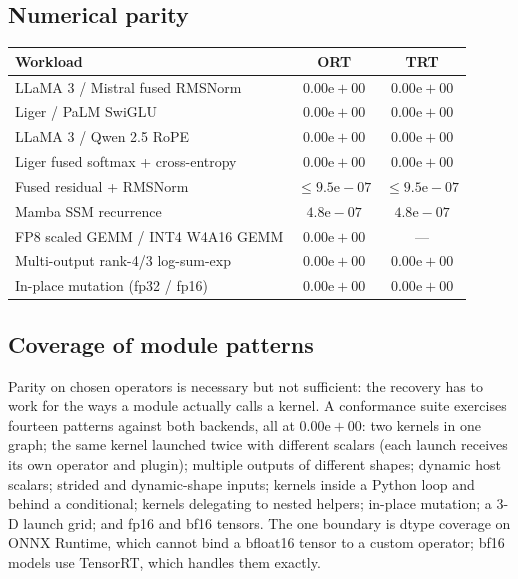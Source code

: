 \documentclass[10pt]{article}
\begin{document}
\subsection{Numerical parity}

\begin{center}
\small
\begin{tabular}{lcc}
\toprule
\textbf{Workload} & \textbf{ORT} & \textbf{TRT} \\ \midrule
LLaMA 3 / Mistral fused RMSNorm & $0.00\text{e}{+}00$ & $0.00\text{e}{+}00$ \\
Liger / PaLM SwiGLU & $0.00\text{e}{+}00$ & $0.00\text{e}{+}00$ \\
LLaMA 3 / Qwen 2.5 RoPE & $0.00\text{e}{+}00$ & $0.00\text{e}{+}00$ \\
Liger fused softmax + cross-entropy & $0.00\text{e}{+}00$ & $0.00\text{e}{+}00$ \\
Fused residual + RMSNorm & $\le 9.5\text{e}{-}07$ & $\le 9.5\text{e}{-}07$ \\
Mamba SSM recurrence & $4.8\text{e}{-}07$ & $4.8\text{e}{-}07$ \\
FP8 scaled GEMM / INT4 W4A16 GEMM & $0.00\text{e}{+}00$ & --- \\
Multi-output rank-4/3 log-sum-exp & $0.00\text{e}{+}00$ & $0.00\text{e}{+}00$ \\
In-place mutation (fp32 / fp16) & $0.00\text{e}{+}00$ & $0.00\text{e}{+}00$ \\
\bottomrule
\end{tabular}
\label{tab:parity}
\end{center}

\subsection{Coverage of module patterns}

Parity on chosen operators is necessary but not sufficient: the recovery has to
work for the ways a module actually calls a kernel. A conformance suite exercises
fourteen patterns against both backends, all at $0.00\text{e}{+}00$: two kernels
in one graph; the same kernel launched twice with different scalars (each launch
receives its own operator and plugin); multiple outputs of different shapes;
dynamic host scalars; strided and dynamic-shape inputs; kernels inside a Python
loop and behind a conditional; kernels delegating to nested helpers; in-place
mutation; a 3-D launch grid; and fp16 and bf16 tensors. The one boundary is dtype
coverage on ONNX Runtime, which cannot bind a bfloat16 tensor to a custom
operator; bf16 models use TensorRT, which handles them exactly.
\end{document}
